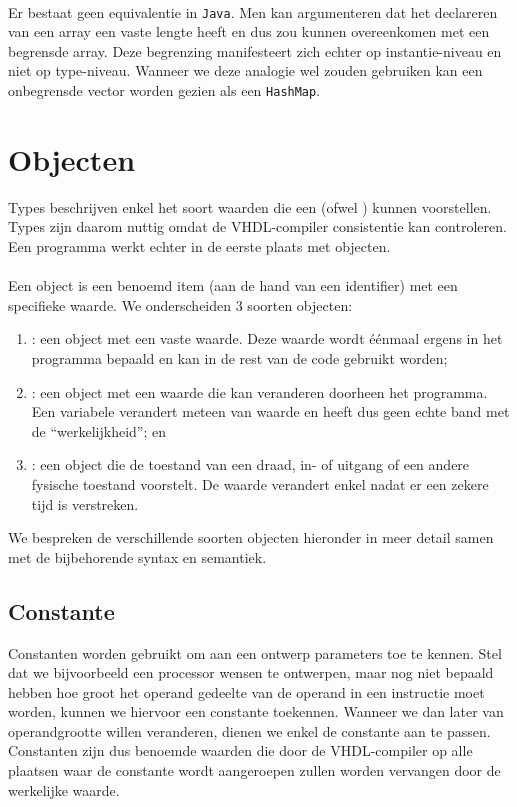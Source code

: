 
\paragraph{}
Er bestaat geen equivalentie in \texttt{Java}. Men kan argumenteren dat het declareren van een array een vaste lengte heeft en dus zou kunnen overeenkomen met een begrensde array. Deze begrenzing manifesteert zich echter op instantie-niveau en niet op type-niveau. Wanneer we deze analogie wel zouden gebruiken kan een onbegrensde vector worden gezien als een \texttt{HashMap}.

\section{Objecten}
Types beschrijven enkel het soort waarden die een  (ofwel ) kunnen voorstellen. Types zijn daarom nuttig omdat de VHDL-compiler consistentie kan controleren. Een programma werkt echter in de eerste plaats met objecten.
\paragraph{}
Een object is een benoemd item (aan de hand van een identifier) met een specifieke waarde. We onderscheiden 3 soorten objecten:
\begin{enumerate}
 \item {}: een object met een vaste waarde. Deze waarde wordt \'e\'enmaal ergens in het programma bepaald en kan in de rest van de code gebruikt worden;
 \item {}: een object met een waarde die kan veranderen doorheen het programma. Een variabele verandert meteen van waarde en heeft dus geen echte band met de ``werkelijkheid''; en
 \item {}: een object die de toestand van een draad, in- of uitgang of een andere fysische toestand voorstelt. De waarde verandert enkel nadat er een zekere tijd is verstreken.
\end{enumerate}

We bespreken de verschillende soorten objecten hieronder in meer detail samen met de bijbehorende syntax en semantiek.

\subsection{Constante}
Constanten worden gebruikt om aan een ontwerp parameters toe te kennen. Stel dat we bijvoorbeeld een processor wensen te ontwerpen, maar nog niet bepaald hebben hoe groot het operand gedeelte van de operand in een instructie moet worden, kunnen we hiervoor een constante toekennen. Wanneer we dan later van operandgrootte willen veranderen, dienen we enkel de constante aan te passen. Constanten zijn dus benoemde waarden die door de VHDL-compiler op alle plaatsen waar de constante wordt aangeroepen zullen worden vervangen door de werkelijke waarde.

